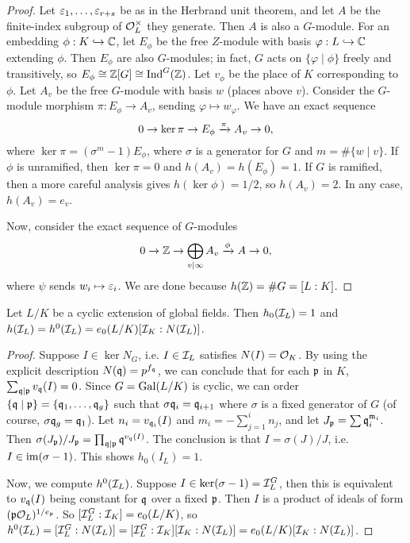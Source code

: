 \documentclass[11pt]{amsart}
\begin{document}
\begin{proof}
    Let $\varepsilon_1,\dots,\varepsilon_{r+s}$ be as in the Herbrand unit theorem, and let $A$ be the finite-index subgroup of $\mathcal{O}_L^\times$ they generate. Then $A$ is also a $G$-module. For an embedding $\phi: K\hookrightarrow \mathbb{C}$, let $E_\phi$ be the free $Z$-module with basis $\varphi: L\hookrightarrow \mathbb{C}$ extending $\phi$. Then $E_\phi$ are also $G$-modules; in fact, $G$ acts on $\{\varphi\mid \phi\}$ freely and transitively, so $E_\phi \cong \mathbb{Z}[G] \cong \operatorname{Ind}^G(\mathbb{Z})$. Let $v_\phi$ be the place of $K$ corresponding to $\phi$. Let $A_v$ be the free $G$-module with basis $w$ (places above $v$). Consider the $G$-module morphism $\pi: E_\phi \to A_v$, sending $\varphi\mapsto w_{\varphi}$. We have an exact sequence
    \[0 \to \ker\pi \to E_\phi \xrightarrow{\pi} A_v \to 0,\]
    where $\ker \pi = (\sigma^{m}-1) E_\phi$, where $\sigma$ is a generator for $G$ and $m = \#\{w\mid v\}$. If $\phi$ is unramified, then $\ker\pi = 0$ and  $h(A_v) = h(E_\phi) = 1$. If $G$ is ramified, then a more careful analysis gives $h(\ker \phi) = 1/2$, so $h(A_v) = 2$. In any case, $h(A_v) = e_v$.

    Now, consider the exact sequence of $G$-modules
    \[0 \to \mathbb{Z} \to \bigoplus_{v\mid\infty} A_v \xrightarrow{\phi} A \to 0,\]
    where $\psi$ sends $w_i \mapsto \varepsilon_i$. We are done because $h(\mathbb{Z}) = \#G = [L:K]$.
\end{proof}

\begin{lem}
    Let $L/K$ be a cyclic extension of global fields. Then $h_0(\mathcal{I}_L) = 1$ and $h(\mathcal{I}_L) = h^0(\mathcal{I}_L) = e_0(L/K)[\mathcal{I}_K: N(\mathcal{I}_L)]$.
\end{lem}

\begin{proof}
    Suppose $I\in \ker N_G$, i.e. $I\in \mathcal{I}_L$ satisfies $N(I) = \mathcal{O}_K$. By using the explicit description $N(\mathfrak{q}) = p^{f_{\mathfrak{q}}}$, we can conclude that for each $\mathfrak{p}$ in $K$, $\sum_{\mathfrak{q}\mid \mathfrak{p}} v_{\mathfrak{q}}(I) = 0$. Since $G = \operatorname{Gal}(L/K)$ is cyclic, we can order $\{\mathfrak{q}\mid \mathfrak{p}\} = \{\mathfrak{q}_1,\dots,\mathfrak{q}_g\}$ such that $\sigma \mathfrak{q}_i = \mathfrak{q}_{i+1}$ where $\sigma$ is a fixed generator of $G$ (of course, $\sigma \mathfrak{q}_g = \mathfrak{q}_1$). Let $n_i = v_{\mathfrak{q}_i}(I)$ and $m_i = -\sum_{j=1}^i n_j$, and let $J_{\mathfrak{p}} = \sum \mathfrak{q}_i^{\mathfrak{m}_i}$. Then $\sigma(J_{\mathfrak{p}})/J_{\mathfrak{p}} = \prod_{\mathfrak{q}\mid \mathfrak{p}} \mathfrak{q}^{v_q(I)}$. The conclusion is that $I = \sigma(J)/J$, i.e. $I\in \operatorname{im}(\sigma-1)$. This shows $h_0(I_L) = 1$.

    Now, we compute $h^0(\mathcal{I}_L)$. Suppose $I\in \ker(\sigma-1) = \mathcal{I}_L^G$, then this is equivalent to $v_{\mathfrak{q}}(I)$ being constant for $\mathfrak{q}$ over a fixed $\mathfrak{p}$. Then $I$ is a product of ideals of form $(\mathfrak{p} \mathcal{O}_L)^{1/e_{\mathfrak{p}}}$. So $[\mathcal{I}_L^G: \mathcal{I}_K] = e_0(L/K)$, so $h^0(\mathcal{I}_L) = [\mathcal{I}_L^G: N(\mathcal{I}_L)] = [\mathcal{I}_L^G: \mathcal{I}_K][\mathcal{I}_K:N(\mathcal{I}_L)] = e_0(L/K)[\mathcal{I}_K: N(\mathcal{I}_L)]$.
\end{proof}
\end{document}
